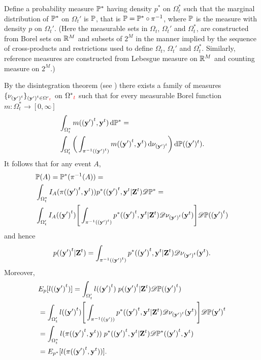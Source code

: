 Define a probability measure $\P^*$ having density $p^*$ on $\Omega^*_t$ such that the marginal distribution of $\P^*$ on $\Omega_t'$ is $\P$, that is $\P = \P^* \circ \pi^{-1}$, where $\P$ is the measure with density $p$ on $\Omega_t'$. (Here the measurable sets in $\Omega_t$, $\Omega_t'$ and $\Omega_t^*$, are constructed from Borel sets on $\Real^M$ and subsets of $2^M$ in the manner implied by the sequence of cross-products and restrictions used to define $\Omega_t$, $\Omega_t'$ and $\Omega_t^*$. Similarly, reference measures are constructed from Lebesgue measure on $\Real^M$ and counting measure on $2^M$.)

By the disintegration theorem (see \cite{Rohlin}) there exists a family of measures $\{ \nu_{\vec{(y')}^t} \}_{\vec{(y')}^t \in \Omega'{\color{red}_t}}$ on $\Omega^*{\color{red}_t}$ such that for every measurable Borel function $m : \Omega^*_t \rightarrow [0, \infty]$
\begin{align*}
    &\int_{\Omega^*_t} m(\vec{(y')}^t, \vec{y}^t)\diff \P^* = \\
    & \int_{\Omega_t'} \bigg( \int_{\pi^{-1}(\vec{(y')}^t)} m(\vec{(y')}^t, \vec{y}^t) \diff \nu_{\vec{(y')}^t}  \bigg) \diff \P((\vec{y'})^t).
\end{align*}
It follows that for any event $A$,
\begin{align*}
    &\P(A) = \P^{*}(\pi^{-1}(A)) = \\
    &\int_{\Omega_t^*} I_A(\pi(\vec{(y')}^t, \vec{y}^t)) p^*(\vec{(y')}^t, \vec{y}^t | \vec{Z}^t) \D \P^*  = \\
    & \int_{\Omega_t'} I_A(\vec{(y')}^t) \Bigg[ \int_{\pi^{-1}(\vec{(y')}^t)} p^*(\vec{(y')}^t, \vec{y}^t | \vec{Z}^t) \D \nu_{\vec{(y')}^t} (\vec{y}^t) \Bigg] \D \P (\vec{(y')}^t)
\end{align*}
and hence
\begin{equation*}
    p(\vec{(y')}^t | \vec{Z}^t) = \int_{\pi^{-1}(\vec{(y')}^t)} p^*(\vec{(y')}^t, \vec{y}^t | \vec{Z}^t) \D \nu_{\vec{(y')}^t}(\vec{y}^t).
\end{equation*}
Moreover,
\begin{align*}
    &E_{p}[l(\vec{(y')}^{t})]  = \int_{\Omega_t'} l(\vec{(y')}^{t})\; p(\vec{(y')}^{t} | \vec{Z}^{t}) \D \P (\vec{(y')}^{t}) \\
    &= \int_{\Omega_t'} l(\vec{(y')}^{t})\Bigg[\int_{\pi^{-1}(\vec(y'))} p^*(\vec{(y')}^{t}, \vec{y}^{t} | \vec{Z}^{t}) \D \nu_{\vec{(y')}^t}(\vec{y}^t) \Bigg] \D \P \vec{(y')}^{t} \\ 
    &= \int_{\Omega_t^*} l(\pi(\vec{(y')}^{t}, \vec{y}^{t}))\; p^*(\vec{(y')}^{t}, \vec{y}^{t} | \vec{Z}^{t}) \D \P^*(\vec{(y')}^t, \vec{y}^t) \\ 
    &= E_{p^*}[l(\pi (\vec{(y')}^{t}, \vec{y}^{t}))].
\end{align*}